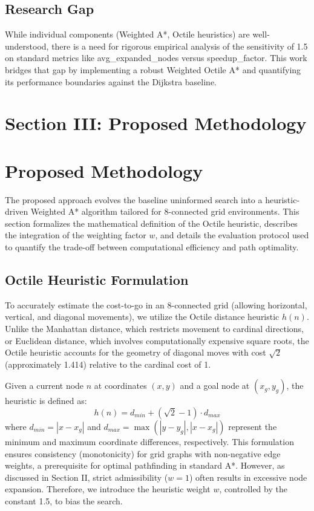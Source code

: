 \documentclass[conference]{IEEEtran}
\renewcommand{\texttt}[1]{{\normalfont\ttfamily #1}}
\begin{document}
\subsection{Research Gap}
While individual components (Weighted A*, Octile heuristics) are well-understood, there is a need for rigorous empirical analysis of the sensitivity of 1.5 on standard metrics like \texttt{avg\_expanded\_nodes} versus \texttt{speedup\_factor}. This work bridges that gap by implementing a robust Weighted Octile A* and quantifying its performance boundaries against the Dijkstra baseline.

\section{Section III: Proposed Methodology}
\section{Proposed Methodology}
\label{sec:methodology}

The proposed approach evolves the baseline uninformed search into a heuristic-driven Weighted A* algorithm tailored for 8-connected grid environments. This section formalizes the mathematical definition of the Octile heuristic, describes the integration of the weighting factor \(w\), and details the evaluation protocol used to quantify the trade-off between computational efficiency and path optimality.

\subsection{Octile Heuristic Formulation}
To accurately estimate the cost-to-go in an 8-connected grid (allowing horizontal, vertical, and diagonal movements), we utilize the Octile distance heuristic \(h(n)\). Unlike the Manhattan distance, which restricts movement to cardinal directions, or Euclidean distance, which involves computationally expensive square roots, the Octile heuristic accounts for the geometry of diagonal moves with cost $\sqrt{2}$ (approximately 1.414) relative to the cardinal cost of 1.

Given a current node \(n\) at coordinates $(x, y)$ and a goal node at $(x_g, y_g)$, the heuristic is defined as:
\begin{equation}
    h(n) = d_{min} + (\sqrt{2} - 1) \cdot d_{max}
\end{equation}
where $d_{min} = |x - x_g|$ and $d_{max} = \max(|y - y_g|, |x - x_g|)$ represent the minimum and maximum coordinate differences, respectively. This formulation ensures consistency (monotonicity) for grid graphs with non-negative edge weights, a prerequisite for optimal pathfinding in standard A*. However, as discussed in Section II, strict admissibility ($w=1$) often results in excessive node expansion. Therefore, we introduce the heuristic weight \(w\), controlled by the constant 1.5, to bias the search.
\end{document}
